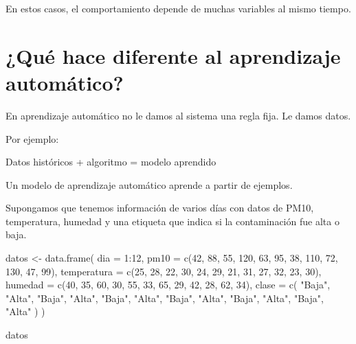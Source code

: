 \documentclass[
  11pt,
  letterpaper,
]{book}
\newenvironment{Shaded}{\begin{snugshade}}{\end{snugshade}}
\newcommand{\AttributeTok}[1]{\textcolor[rgb]{0.40,0.45,0.13}{#1}}
\newcommand{\DecValTok}[1]{\textcolor[rgb]{0.68,0.00,0.00}{#1}}
\newcommand{\FunctionTok}[1]{\textcolor[rgb]{0.28,0.35,0.67}{#1}}
\newcommand{\NormalTok}[1]{\textcolor[rgb]{0.00,0.23,0.31}{#1}}
\newcommand{\OtherTok}[1]{\textcolor[rgb]{0.00,0.23,0.31}{#1}}
\newcommand{\SpecialCharTok}[1]{\textcolor[rgb]{0.37,0.37,0.37}{#1}}
\newcommand{\StringTok}[1]{\textcolor[rgb]{0.13,0.47,0.30}{#1}}
\begin{document}
En estos casos, el comportamiento depende de muchas variables al mismo
tiempo.

\section{¿Qué hace diferente al aprendizaje
automático?}\label{quuxe9-hace-diferente-al-aprendizaje-automuxe1tico}

En aprendizaje automático no le damos al sistema una regla fija. Le
damos datos.

Por ejemplo:

\begin{Shaded}
\begin{Highlighting}[]
\NormalTok{Datos históricos + algoritmo = modelo aprendido}
\end{Highlighting}
\end{Shaded}

Un modelo de aprendizaje automático aprende a partir de ejemplos.

Supongamos que tenemos información de varios días con datos de PM10,
temperatura, humedad y una etiqueta que indica si la contaminación fue
alta o baja.

\begin{Shaded}
\begin{Highlighting}[]
\NormalTok{datos }\OtherTok{\textless{}{-}} \FunctionTok{data.frame}\NormalTok{(}
  \AttributeTok{dia =} \DecValTok{1}\SpecialCharTok{:}\DecValTok{12}\NormalTok{,}
  \AttributeTok{pm10 =} \FunctionTok{c}\NormalTok{(}\DecValTok{42}\NormalTok{, }\DecValTok{88}\NormalTok{, }\DecValTok{55}\NormalTok{, }\DecValTok{120}\NormalTok{, }\DecValTok{63}\NormalTok{, }\DecValTok{95}\NormalTok{, }\DecValTok{38}\NormalTok{, }\DecValTok{110}\NormalTok{, }\DecValTok{72}\NormalTok{, }\DecValTok{130}\NormalTok{, }\DecValTok{47}\NormalTok{, }\DecValTok{99}\NormalTok{),}
  \AttributeTok{temperatura =} \FunctionTok{c}\NormalTok{(}\DecValTok{25}\NormalTok{, }\DecValTok{28}\NormalTok{, }\DecValTok{22}\NormalTok{, }\DecValTok{30}\NormalTok{, }\DecValTok{24}\NormalTok{, }\DecValTok{29}\NormalTok{, }\DecValTok{21}\NormalTok{, }\DecValTok{31}\NormalTok{, }\DecValTok{27}\NormalTok{, }\DecValTok{32}\NormalTok{, }\DecValTok{23}\NormalTok{, }\DecValTok{30}\NormalTok{),}
  \AttributeTok{humedad =} \FunctionTok{c}\NormalTok{(}\DecValTok{40}\NormalTok{, }\DecValTok{35}\NormalTok{, }\DecValTok{60}\NormalTok{, }\DecValTok{30}\NormalTok{, }\DecValTok{55}\NormalTok{, }\DecValTok{33}\NormalTok{, }\DecValTok{65}\NormalTok{, }\DecValTok{29}\NormalTok{, }\DecValTok{42}\NormalTok{, }\DecValTok{28}\NormalTok{, }\DecValTok{62}\NormalTok{, }\DecValTok{34}\NormalTok{),}
  \AttributeTok{clase =} \FunctionTok{c}\NormalTok{(}
    \StringTok{"Baja"}\NormalTok{, }\StringTok{"Alta"}\NormalTok{, }\StringTok{"Baja"}\NormalTok{, }\StringTok{"Alta"}\NormalTok{,}
    \StringTok{"Baja"}\NormalTok{, }\StringTok{"Alta"}\NormalTok{, }\StringTok{"Baja"}\NormalTok{, }\StringTok{"Alta"}\NormalTok{,}
    \StringTok{"Baja"}\NormalTok{, }\StringTok{"Alta"}\NormalTok{, }\StringTok{"Baja"}\NormalTok{, }\StringTok{"Alta"}
\NormalTok{  )}
\NormalTok{)}

\NormalTok{datos}
\end{Highlighting}
\end{Shaded}
\end{document}
